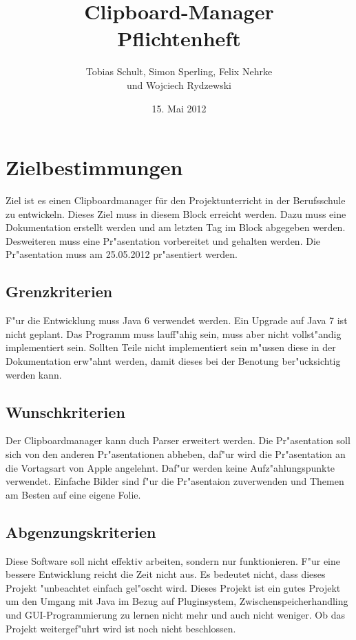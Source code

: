 \documentclass[a4paper,11pt,abstracton,titlepage]{scrartcl}
\title{Clipboard-Manager\\Pflichtenheft}
\author{Tobias Schult, Simon Sperling, Felix Nehrke\\ und Wojciech Rydzewski}
\date{15. Mai 2012}
\begin{document}
\maketitle

\tableofcontents
\thispagestyle{empty}
\newpage
\setlength{\parskip}{1em}
\setcounter{page}{1}
\section{Zielbestimmungen}
Ziel ist es einen Clipboardmanager für den Projektunterricht in der Berufsschule zu entwickeln. Dieses Ziel muss in diesem Block erreicht werden.
Dazu muss eine Dokumentation erstellt werden und am letzten Tag im Block abgegeben werden.
Desweiteren muss eine Pr"asentation vorbereitet und gehalten werden. Die Pr"asentation muss am 25.05.2012 pr"asentiert werden.
\subsection{Grenzkriterien}
F"ur die Entwicklung muss Java\footnotesize{\texttrademark} \normalsize 6 verwendet werden. Ein Upgrade auf Java\footnotesize{\texttrademark} \normalsize 7 ist nicht geplant.
Das Programm muss lauff"ahig sein, muss aber nicht vollst"andig implementiert sein. Sollten Teile nicht implementiert sein m"ussen diese in der Dokumentation erw"ahnt werden, damit dieses bei der Benotung ber"ucksichtig werden kann.
\subsection{Wunschkriterien}
Der Clipboardmanager kann duch Parser erweitert werden.
Die Pr"asentation soll sich von den anderen Pr"asentationen abheben, daf"ur wird die Pr"asentation an die Vortagsart von Apple angelehnt. Daf"ur werden keine Aufz"ahlungspunkte verwendet. Einfache Bilder sind f"ur die Pr"asentaion zuverwenden und Themen am Besten auf eine eigene Folie.
\subsection{Abgenzungskriterien}
Diese Software soll nicht effektiv arbeiten, sondern nur funktionieren.
F"ur eine bessere Entwicklung reicht die Zeit nicht aus. Es bedeutet nicht, dass dieses  Projekt "unbeachtet einfach gel"oscht wird. Dieses Projekt ist ein gutes Projekt um den Umgang mit Java\footnotesize{\texttrademark} \normalsize im Bezug auf Pluginsystem, Zwischenspeicherhandling und GUI-Programmierung zu lernen nicht mehr und auch nicht weniger. Ob das Projekt weitergef"uhrt wird ist noch nicht beschlossen.  
\end{document}
